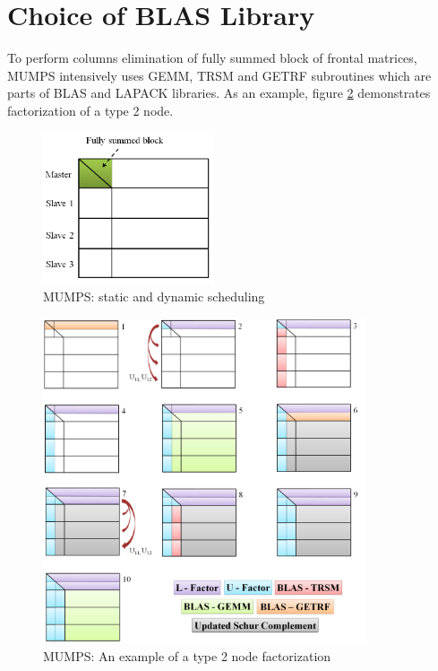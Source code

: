 \section{Choice of BLAS Library}
\label{subseq:blas-comparison}


To perform columns elimination of fully summed block of frontal matrices, MUMPS intensively uses GEMM, TRSM and GETRF subroutines which are parts of BLAS and LAPACK libraries. As an example, figure \ref{fig:mumps:steps-of-type-2-factorization} demonstrates factorization of a type 2 node.\\


\figpointer{\ref{fig:mumps:type-2-frontal-matrix}}
\begin{figure}[htpb]
  \centering
  \includegraphics[width=0.45\textwidth]{figures/chapter-2/mumps-type-2-frontal-matrix.png}
\caption{MUMPS: static and dynamic scheduling}
\label{fig:mumps:type-2-frontal-matrix}
\end{figure}


\begin{figure}[htpb]
  \centering
  \includegraphics[width=0.85\textwidth]{figures/chapter-2/mumps-type-2-part-1.png}
\caption{MUMPS: An example of a type 2 node factorization}
\label{fig:mumps:steps-of-type-2-factorization}
\end{figure}



